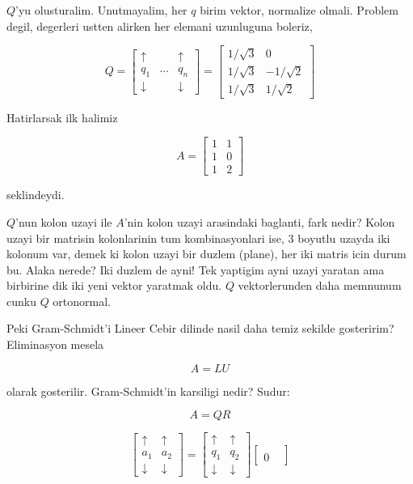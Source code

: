 \documentclass[12pt,fleqn]{article}\usepackage{../common}
\begin{document}
$Q$'yu olusturalim. Unutmayalim, her $q$ birim vektor, normalize
olmali. Problem degil, degerleri ustten alirken her elemani uzunluguna
boleriz, 

\[ Q =
\left[\begin{array}{rrr}
\uparrow &  & \uparrow \\
q_1 & ... &  q_n \\
\downarrow &  & \downarrow 
\end{array}\right]
=
\left[\begin{array}{rr}
1/\sqrt{3} & 0 \\
1/\sqrt{3} & -1/\sqrt{2} \\
1/\sqrt{3} & 1/\sqrt{2} 
\end{array}\right]
 \]

Hatirlarsak ilk halimiz

\[ A =
\left[\begin{array}{rr}
1 & 1 \\
1 & 0\\
1 & 2
\end{array}\right]
 \]

seklindeydi. 

$Q$'nun kolon uzayi ile $A$'nin kolon uzayi arasindaki baglanti, fark
nedir? Kolon uzayi bir matrisin kolonlarinin tum kombinasyonlari ise, 3
boyutlu uzayda iki kolonum var, demek ki kolon uzayi bir duzlem (plane),
her iki matris icin durum bu. Alaka nerede? Iki duzlem de ayni! Tek
yaptigim ayni uzayi yaratan ama birbirine dik iki yeni vektor yaratmak
oldu. $Q$ vektorlerunden daha memnunum cunku $Q$ ortonormal. 

Peki Gram-Schmidt'i Lineer Cebir dilinde nasil daha temiz sekilde
gosteririm? Eliminasyon mesela 

\[ A = LU \]

olarak gosterilir. Gram-Schmidt'in karsiligi nedir? Sudur:

\[ A = QR \]


\[ 
\left[\begin{array}{rrr}
\uparrow &  \uparrow \\
a_1 &  a_2 \\
\downarrow &  \downarrow 
\end{array}\right]
=
\left[\begin{array}{rrr}
\uparrow &  \uparrow \\
q_1 &  q_2 \\
\downarrow &  \downarrow 
\end{array}\right]
\left[\begin{array}{rrr}
 &   \\
0 &  
\end{array}\right]
 \]
\end{document}
